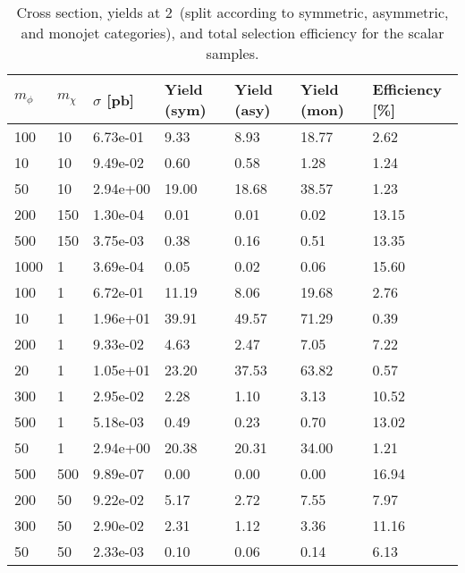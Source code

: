\begin{table}
\small
\centering
\begin{tabular}{lllllll}
\hline
$m_\phi$ & $m_\chi$ & $\sigma$ [pb] & Yield (sym) & Yield (asy) & Yield (mon) & Efficiency [\%] \\ \hline
100       &   10        &   6.73e-01  &   9.33      &   8.93      &   18.77     &   2.62      \\ 
10        &   10        &   9.49e-02  &   0.60      &   0.58      &   1.28      &   1.24      \\ 
50        &   10        &   2.94e+00  &   19.00     &   18.68     &   38.57     &   1.23      \\ 
200       &   150       &   1.30e-04  &   0.01      &   0.01      &   0.02      &   13.15     \\ 
500       &   150       &   3.75e-03  &   0.38      &   0.16      &   0.51      &   13.35     \\ 
1000      &   1         &   3.69e-04  &   0.05      &   0.02      &   0.06      &   15.60     \\ 
100       &   1         &   6.72e-01  &   11.19     &   8.06      &   19.68     &   2.76      \\ 
10        &   1         &   1.96e+01  &   39.91     &   49.57     &   71.29     &   0.39      \\ 
200       &   1         &   9.33e-02  &   4.63      &   2.47      &   7.05      &   7.22      \\ 
20        &   1         &   1.05e+01  &   23.20     &   37.53     &   63.82     &   0.57      \\ 
300       &   1         &   2.95e-02  &   2.28      &   1.10      &   3.13      &   10.52     \\ 
500       &   1         &   5.18e-03  &   0.49      &   0.23      &   0.70      &   13.02     \\ 
50        &   1         &   2.94e+00  &   20.38     &   20.31     &   34.00     &   1.21      \\ 
500       &   500       &   9.89e-07  &   0.00      &   0.00      &   0.00      &   16.94     \\ 
200       &   50        &   9.22e-02  &   5.17      &   2.72      &   7.55      &   7.97      \\ 
300       &   50        &   2.90e-02  &   2.31      &   1.12      &   3.36      &   11.16     \\ 
50        &   50        &   2.33e-03  &   0.10      &   0.06      &   0.14      &   6.13      \\ 
\hline
\end{tabular}
\caption{Cross section, yields at 2~\ifb (split according to symmetric, asymmetric, and monojet categories), and total selection efficiency for the scalar \DMtt samples.}
\label{summaryTableAN_DMttS_xs10_2p1fb_exp}
\end{table}
